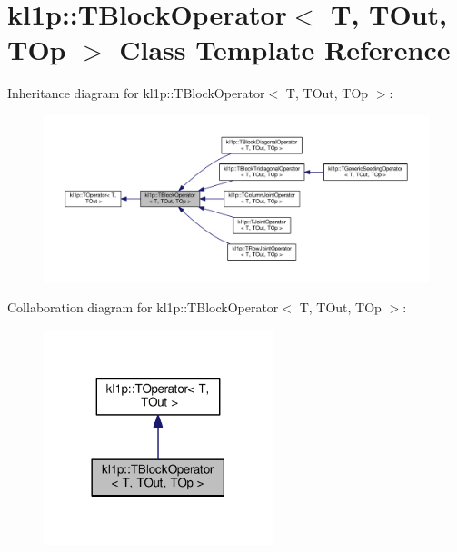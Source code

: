 \hypertarget{classkl1p_1_1TBlockOperator}{}\section{kl1p\+:\+:T\+Block\+Operator$<$ T, T\+Out, T\+Op $>$ Class Template Reference}
\label{classkl1p_1_1TBlockOperator}


Inheritance diagram for kl1p\+:\+:T\+Block\+Operator$<$ T, T\+Out, T\+Op $>$\+:
\nopagebreak
\begin{figure}[H]
\begin{center}
\leavevmode
\includegraphics[width=350pt]{classkl1p_1_1TBlockOperator__inherit__graph}
\end{center}
\end{figure}


Collaboration diagram for kl1p\+:\+:T\+Block\+Operator$<$ T, T\+Out, T\+Op $>$\+:
\nopagebreak
\begin{figure}[H]
\begin{center}
\leavevmode
\includegraphics[width=189pt]{classkl1p_1_1TBlockOperator__coll__graph}
\end{center}
\end{figure}
